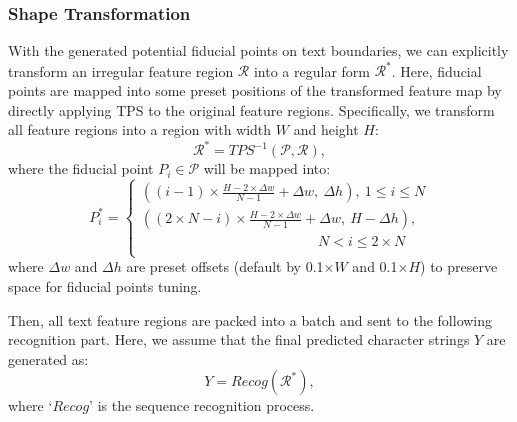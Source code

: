 \documentclass[letterpaper]{article} \usepackage{aaai20}  \usepackage{times}  \usepackage{helvet} \usepackage{courier}  \usepackage[hyphens]{url}  \usepackage{graphicx} \urlstyle{rm} \def\UrlFont{\rm}  \usepackage{graphicx}  \frenchspacing  \setlength{\pdfpagewidth}{8.5in}  \setlength{\pdfpageheight}{11in}  \usepackage{amsmath}
\begin{document}
\subsubsection{Shape Transformation}
With the generated potential fiducial points on text boundaries, we can explicitly transform an irregular feature region $\mathcal{R}$ into a regular form $\mathcal{R}^*$.
Here, fiducial points are mapped into some preset positions of the transformed feature map by directly applying TPS to the original feature regions.
Specifically, we transform all feature regions into a region with width $W$ and height $H$:
\begin{equation}
\mathcal{R}^* = TPS^{-1}(\mathcal{P}, \mathcal{R}),
\end{equation}
where the fiducial point $P_i \in \mathcal{P}$ will be mapped into:
\begin{equation}
P^*_i = \left\{
\begin{array}{lr}
\left((i-1)\times\frac{H-2\times\Delta w}{N-1}+\Delta w, ~\Delta h  \right) ,  ~ 1 \le i \le N\\
\left((2\times N -i)\times\frac{H-2\times\Delta w}{N-1}+\Delta w, ~ H-\Delta h    \right), \\
~~~\qquad \qquad \qquad \qquad\qquad \qquad   N < i \le 2\times N\\
\end{array}
\right.
\end{equation}
where $\Delta w$ and $\Delta h$ are preset offsets (default by 0.1$\times W$ and 0.1$\times H$) to preserve space for fiducial points tuning.

Then, all text feature regions are packed into a batch and sent to the following recognition part.
Here, we assume that the final predicted character strings $Y$ are generated as:
\begin{equation}
Y = Recog(\mathcal{R}^*),
\end{equation}
where `$Recog$' is the sequence recognition process.
\end{document}
